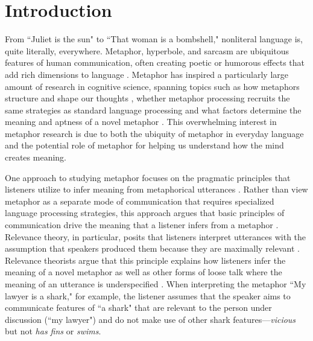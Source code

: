 \documentclass[10pt,letterpaper]{article}
\begin{document}
\section{Introduction}
From ``Juliet is the sun" to ``That woman is a bombshell," nonliteral language is, quite literally, everywhere. Metaphor, hyperbole, and sarcasm are ubiquitous features of human communication, often creating poetic or humorous effects that add rich dimensions to language \cite{glucksberg2001understanding, pilkington2000poetic, lakoff2009more, roberts1994people}. Metaphor has inspired a particularly large amount of research in cognitive science, spanning topics such as how metaphors structure and shape our thoughts \cite{ortony1993metaphor, lakoff1993contemporary, thibodeau2011metaphors}, whether metaphor processing recruits the same strategies as standard language processing \cite{giora1997understanding, gibbs2002new, glucksberg1993metaphors} and what factors determine the meaning and aptness of a novel metaphor \cite{blasko1993effects, tourangeau1981aptness, kintsch2002metaphor}. This overwhelming interest in metaphor research is due to both the ubiquity of metaphor in everyday language and the potential role of metaphor for helping us understand how the mind creates meaning. 

One approach to studying metaphor focuses on the pragmatic principles that listeners utilize to infer meaning from metaphorical utterances \cite{tendahl2008complementary}. Rather than view metaphor as a separate mode of communication that requires specialized language processing strategies, this approach argues that basic principles of communication drive the meaning that a listener infers from a metaphor \cite{sperber2008deflationary, wilson2006metaphor}. Relevance theory, in particular, posits that listeners interpret utterances with the assumption that speakers produced them because they are maximally relevant \cite{wilson2002relevance}. Relevance theorists argue that this principle explains how listeners infer the meaning of a novel metaphor as well as other forms of loose talk where the meaning of an utterance is underspecified  \cite{sperber1985loose}. When interpreting the metaphor ``My lawyer is a shark," for example, the listener assumes that the speaker aims to communicate features of  ``a shark" that are relevant to the person under discussion (``my lawyer") and do not make use of other shark features---\emph{vicious} but not \emph{has fins} or \emph{swims}.
\end{document}
